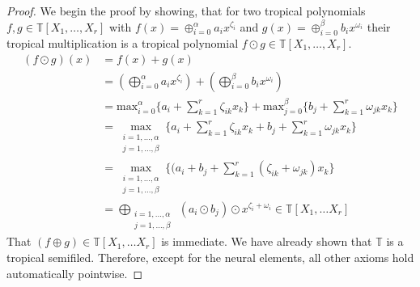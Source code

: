 \documentclass{article}
\theoremstyle{definition}
\begin{document}
\begin{proof}
We begin the proof by showing, that for two tropical polynomials $f, g \in \mathbb{T}[X_1, \dots , X_r]$ with $f(x) =\oplus_{i=0}^{\alpha} a_{i} x^{\zeta_{i}}$ and $g(x)= \oplus_{i=0}^{\beta} b_{i} x^{\omega_{i}}$ their tropical multiplication is a tropical polynomial $f \odot g \in \mathbb{T}[X_1, \dots , X_r]$.
\begin{align*} 
(f \odot g)(x) &= f(x) + g(x) \\
&=  (\bigoplus_{i=0}^{\alpha} a_{i} x^{\zeta_{i}}) + (\bigoplus_{i=0}^{\beta} b_{i} x^{\omega_{i}}) \\
&= \text{max}_{i=0}^{\alpha} \{ a_{i} + \sum_{k=1}^{r} \zeta_{ik} x_{k} \} + \text{max}_{j=0}^{\beta} \{ b_{j} + \sum_{k=1}^{r} \omega_{jk} x_{k} \} \\
&= \max_{\substack{
   i=1, \dots , \alpha \\
   j=1, \dots , \beta
  }} \{ a_{i} + \sum_{k=1}^{r} \zeta_{ik} x_{k} + b_{j} + \sum_{k=1}^{r} \omega_{jk} x_{k} \} \\
&= \max_{\substack{
   i=1, \dots , \alpha \\
   j=1, \dots , \beta
  }} \{ (a_{i} + b_{j} + \sum_{k=1}^{r} (\zeta_{ik} + \omega_{jk}) x_{k} \} \\
&= \bigoplus_{\substack{
   i=1, \dots , \alpha \\
   j=1, \dots , \beta
  }} \ (a_{i} \odot b_{j}) \odot x^{\zeta_{i} + \omega_{i}} \in \mathbb{T}[X_1, \dots X_r]
\end{align*}
That $(f \oplus g) \in \mathbb{T}[X_1, \dots X_r]$ is immediate. We have already shown that $\mathbb{T}$ is a tropical semifiled. Therefore, except for the neural elements, all other axioms hold automatically pointwise.


\end{proof}
\end{document}
